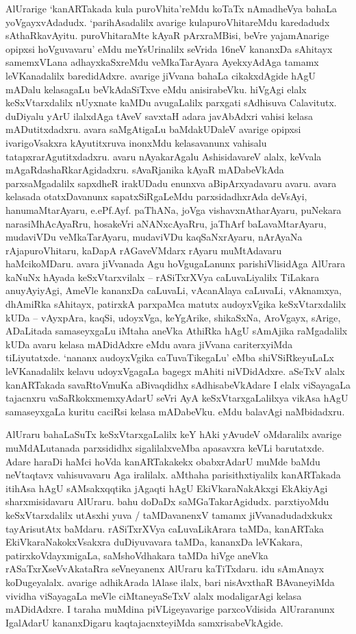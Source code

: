 \documentclass[11pt,a4size]{article}
\begin{document}
AlUrarige `kanARTakada kula puroVhita'reMdu koTaTx nAmadheVya bahaLa
yoVgayxvAdadudx. `parihAsadalilx avarige kulapuroVhitareMdu karedadudx
sAthaRkavAyitu. puroVhitaraMte kAyaR pArxraMBisi, beVre yajamAnarige
opipxsi hoVguvavaru' eMdu meYsUrinalilx seVrida 16neV kananxDa
sAhitayx samemxVLana adhayxkaSxreMdu veMkaTarAyara AyekxyAdAga tamamx
leVKanadalilx baredidAdxre. avarige jiVvana bahaLa cikakxdAgide hAgU
mADalu kelasagaLu beVkAdaSiTxve eMdu anisirabeVku. hiVgAgi elalx
keSxVtarxdalilx nUyxnate kaMDu avugaLalilx parxgati sAdhisuva
Calavitutx. duDiyalu yArU ilalxdAga tAveV savxtaH adara javAbAdxri
vahisi kelasa mADutitxdadxru. avara saMgAtigaLu baMdakUDaleV avarige
opipxsi ivarigoVsakxra kAyutitxruva inonxMdu kelasavanunx vahisalu
tatapxrarAgutitxdadxru. avaru nAyakarAgalu AshisidavareV alalx,
keVvala mAgaRdashaRkarAgidadxru. sAvaRjanika kAyaR mADa\-beVkAda
parxsaMgadalilx sapxdheR irakUDadu enunxva aBipArxyadavaru
avaru. avara kelasada otatxDavanunx sapatxSiRgaLeMdu parxsidadhxrAda
deVsAyi, hanumaMtarAyaru, e.ePf.Ayf. paThANa, joVga
vishavxnAtharAyaru, puNekara narasiMhAcAyaRru, hosakeVri aNANxcAyaRru,
jaThArf baLavaMtarAyaru, mudaviVDu veMkaTarAyaru, mudaviVDu
kaqSaNxrAyaru, nArAyaNa rAjapuroVhitaru, kaDapA rAGaveVMdarx rAyaru
muMtAdavaru haMcikoMDaru. avara jiVvanada Agu hoVgugaLanunx
parishiVlisidAga AlUrara kaNuNx hAyada keSxVtarxvilalx -- rASiTxrXVya
caLuvaLiyalilx TiLakara anuyAyiyAgi, AmeVle kananxDa caLuvaLi,
vAcanAlaya caLuvaLi, vAknamxya, dhAmiRka sAhitayx, patirxkA parxpaMca
matutx audoyxVgika keSxVtarxdalilx kUDa -- vAyxpAra, kaqSi, udoyxVga,
keYgArike, shikaSxNa, AroVgayx, sArige, ADaLitada samaseyxgaLu iMtaha
aneVka AthiRka hAgU sAmAjika raMgadalilx kUDa avaru kelasa mADidAdxre
eMdu avara jiVvana cariterxyiMda tiLiyutatxde. `nananx audoyxVgika
caTuvaTikegaLu' eMba shiVSiRkeyuLaLx leVKanadalilx kelavu udoyxVgagaLa
bagegx mAhiti niVDidAdxre. aSeTxV alalx kanARTakada savaRtoVmuKa
aBivaqdidhx sAdhisabeVkAdare I elalx viSayagaLa tajacnxru
vaSaRkokxmemxyAdarU seVri AyA keSxVtarxgaLalilxya vikAsa hAgU
samaseyxgaLa kuritu caciRsi kelasa mADabeVku. eMdu balavAgi
naMbidadxru.

AlUraru bahaLaSuTx keSxVtarxgaLalilx keY hAki yAvudeV oMdaralilx
avarige muMdALutanada parxsididhx sigalilalxveMba apasavxra keVLi
barutatxde. Adare haraDi haMci hoVda kanARTakakekx obabxrAdarU muMde
baMdu neVtaqtavx vahisuvavaru Aga iralilalx. aMthaha parisithxtiyalilx
kanARTakada itihAsa hAgU sAMsakxqqtika jAgaqti hAgU EkiVkaraNakAkxgi
EkAkiyAgi sharxmisidavaru AlUraru. bahu doDaDx
saMGaTakarAgidudx. parxtiyoMdu keSxVtarxdalilx utAsxhi yuva /
taMDavanenxV tamamx jiVvanadudadxkukx tayArisutAtx baMdaru. rASiTxrXVya
caLuvaLikArara taMDa, kanARTaka EkiVkaraNakokxVsakxra duDiyuvavara
taMDa, kananxDa leVKakara, patirxkoVdayxmigaLa, saMshoVdhakara taMDa
hiVge aneVka rASaTxrXseVvAkataRra seVneyanenx AlUraru kaTiTxdaru. idu
sAmAnayx koDugeyalalx. avarige adhikArada lAlase ilalx, bari
nisAvxthaR BAvaneyiMda vividha viSayagaLa meVle ciMtaneyaSeTxV alalx
modaligarAgi kelasa mADidAdxre. I taraha muMdina piVLigeyavarige
parxcoVdisida AlUraranunx IgalAdarU kananxDigaru kaqtajacnxteyiMda
samxrisabeVkAgide.
\end{document}
